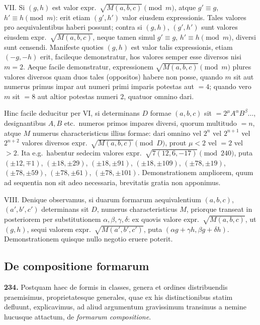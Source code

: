 \documentclass[12pt,a4paper]{article}
\theoremstyle{plain}
\theoremstyle{definition}
\theoremstyle{remark}
\begin{document}
\textsc{VII.} Si $(g,h)$ est valor expr.\ $\sqrt{M(a,b,c)}\pmod{m}$, atque $g'\equiv g$, $h'\equiv h\pmod{m}$: erit etiam $(g',h')$ valor eiusdem expressionis. Tales valores pro aequivalentibus haberi possunt; contra si $(g,h)$, $(g',h')$ sunt valores eiusdem expr.\ $\sqrt{M(a,b,c)}$, neque tamen simul $g'\equiv g$, $h'\equiv h\pmod{m}$, diversi sunt censendi. Manifeste quoties $(g,h)$ est valor talis expressionis, etiam $(-g,-h)$ erit, facileque demonstratur, hos valores semper esse diversos nisi $m=2$. Aeque facile demonstratur, expressionem $\sqrt{M(a,b,c)}\pmod{m}$ plures valores diversos quam duos tales (oppositos) habere non posse, quando $m$ sit aut numerus primus impar aut numeri primi imparis potestas aut $=4$; quando vero $m$ sit $=8$ aut altior potestas numeri $2$, quatuor omnino dari.

Hinc facile deducitur per VI, si determinans $D$ formae $(a,b,c)$ sit $=2^\mu A^\alpha B^\beta\ldots$, designantibus $A,B$ etc.\ numeros primos impares diversi, quorum multitudo $=n$, atque $M$ numerus characteristicus illius formae: dari omnino vel $2^n$ vel $2^{n+1}$ vel $2^{n+2}$ valores diversos expr.\ $\sqrt{M(a,b,c)}\pmod{D}$, prout $\mu<2$ vel $=2$ vel $>2$. Ita e.g.\ habentur sedecim valores expr.\ $\sqrt{7(12,6,-17)}\pmod{240}$, puta $(\pm12,\mp1)$, $(\pm18,\pm29)$, $(\pm18,\pm91)$, $(\pm18,\pm109)$, $(\pm78,\pm19)$, $(\pm78,\pm59)$, $(\pm78,\pm61)$, $(\pm78,\pm101)$. Demonstrationem ampliorem, quum ad sequentia non sit adeo necessaria, brevitatis gratia non apponimus.

\textsc{VIII.} Denique observamus, si duarum formarum aequivalentium $(a,b,c)$, $(a',b',c')$ determinans sit $D$, numerus characteristicus $M$, priorque transeat in posteriorem per substitutionem $\alpha,\beta,\gamma,\delta$: ex quovis valore expr.\ $\sqrt{M(a,b,c)}$, ut $(g,h)$, sequi valorem expr.\ $\sqrt{M(a',b',c')}$, puta $(\alpha g+\gamma h,\beta g+\delta h)$. Demonstrationem quisque nullo negotio eruere poterit.


\subsection*{De compositione formarum}

\textbf{234.}
Postquam haec de formis in classes, genera et ordines distribuendis praemisimus, proprietatesque generales, quae ex his distinctionibus statim defluunt, explicavimus, ad aliud argumentum gravissimum transimus a nemine hucusque attactum, de \emph{formarum compositione}.
\end{document}
